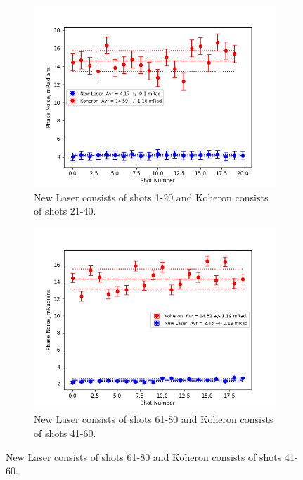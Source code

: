 \documentclass[12pt,a4paper,oneside]{report}
\begin{document}
\begin{figure}[H] 
\begin{subfigure}{.5\textwidth}
\centering\captionsetup{width=.9\linewidth}
\includegraphics[width=\textwidth, angle=0]{DImages/Phase_Noise_for_Shots_1and_2.png}
\caption{New Laser consists of shots 1-20 and Koheron consists of shots 21-40.}
\end{subfigure}
\begin{subfigure}{.5\textwidth}
\centering\captionsetup{width=.9\linewidth}
\includegraphics[width=\textwidth, angle=0]{DImages/Phase_Noise_for_Shots_3and_4.png}
\caption{New Laser consists of shots 61-80 and Koheron consists of shots 41-60.}
\end{subfigure}

\end{figure}
\end{document}
